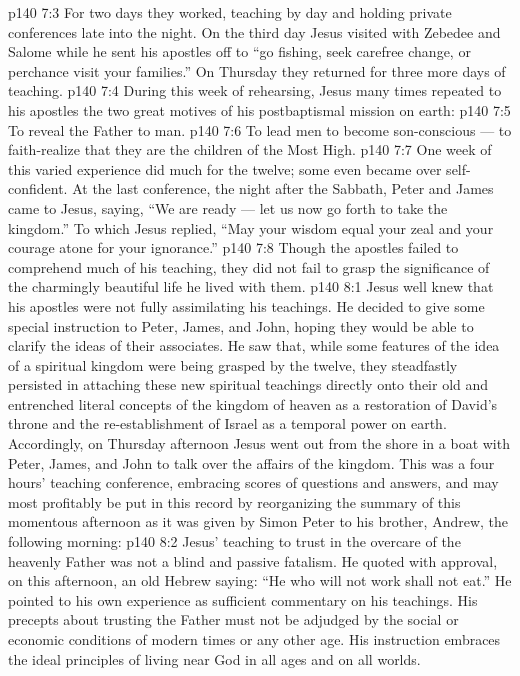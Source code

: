 \vs p140 7:3 For two days they worked, teaching by day and holding private conferences late into the night. On the third day Jesus visited with Zebedee and Salome while he sent his apostles off to \textcolor{ubdarkred}{“go fishing, seek carefree change, or perchance visit your families.”} On Thursday they returned for three more days of teaching.
\vs p140 7:4 During this week of rehearsing, Jesus many times repeated to his apostles the two great motives of his postbaptismal mission on earth:
\vs p140 7:5 \bibnobreakspace To reveal the Father to man.
\vs p140 7:6 \bibnobreakspace To lead men to become son\hyp{}conscious --- to faith\hyp{}realize that they are the children of the Most High.
\vs p140 7:7 \pc One week of this varied experience did much for the twelve; some even became over self\hyp{}confident. At the last conference, the night after the Sabbath, Peter and James came to Jesus, saying, “We are ready --- let us now go forth to take the kingdom.” To which Jesus replied, \textcolor{ubdarkred}{“May your wisdom equal your zeal and your courage atone for your ignorance.”}
\vs p140 7:8 Though the apostles failed to comprehend much of his teaching, they did not fail to grasp the significance of the charmingly beautiful life he lived with them.
\vs p140 8:1 Jesus well knew that his apostles were not fully assimilating his teachings. He decided to give some special instruction to Peter, James, and John, hoping they would be able to clarify the ideas of their associates. He saw that, while some features of the idea of a spiritual kingdom were being grasped by the twelve, they steadfastly persisted in attaching these new spiritual teachings directly onto their old and entrenched literal concepts of the kingdom of heaven as a restoration of David’s throne and the re\hyp{}establishment of Israel as a temporal power on earth. Accordingly, on Thursday afternoon Jesus went out from the shore in a boat with Peter, James, and John to talk over the affairs of the kingdom. This was a four hours’ teaching conference, embracing scores of questions and answers, and may most profitably be put in this record by reorganizing the summary of this momentous afternoon as it was given by Simon Peter to his brother, Andrew, the following morning:
\vs p140 8:2 \bibnobreakspace {} Jesus’ teaching to trust in the overcare of the heavenly Father was not a blind and passive fatalism. He quoted with approval, on this afternoon, an old Hebrew saying: \textcolor{ubdarkred}{“He who will not work shall not eat.”} He pointed to his own experience as sufficient commentary on his teachings. His precepts about trusting the Father must not be adjudged by the social or economic conditions of modern times or any other age. His instruction embraces the ideal principles of living near God in all ages and on all worlds.
